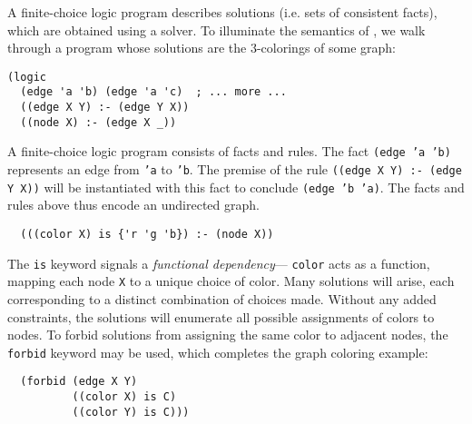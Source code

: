 \documentclass[dvipsnames,sigplan,screen,review,anonymous,acmthm,nonacm]{acmart}
\begin{document}
A finite-choice logic program describes solutions
(i.e. sets of consistent facts), which are obtained using a solver.
To illuminate the semantics of \miniDusa{}, we walk through
a program whose solutions are the 3-colorings of some graph:

\begin{verbatim}
(logic
  (edge 'a 'b) (edge 'a 'c)  ; ... more ...
  ((edge X Y) :- (edge Y X))
  ((node X) :- (edge X _))
\end{verbatim}

A finite-choice logic program consists of facts and rules.
The fact \texttt{(edge 'a 'b)} represents an edge from \texttt{'a} to \texttt{'b}.
The premise of the rule \texttt{((edge X Y) :- (edge Y X))} will be
instantiated with this fact to conclude \texttt{(edge 'b 'a)}.
The facts and rules above thus encode an undirected graph.

\begin{verbatim}
  (((color X) is {'r 'g 'b}) :- (node X))
\end{verbatim}

The \texttt{is} keyword signals a \emph{functional dependency}---%
\texttt{color} acts as a function, mapping each node \texttt{X} to a unique
choice of color. Many solutions will arise,
each corresponding to a distinct combination of choices made.
Without any added constraints, the solutions will enumerate all
possible assignments of colors to nodes. To forbid solutions from
assigning the same color to adjacent nodes, 
the \texttt{forbid} keyword may be used, which
completes the graph coloring example:

\begin{verbatim}
  (forbid (edge X Y)
          ((color X) is C)
          ((color Y) is C)))
\end{verbatim}
\end{document}
